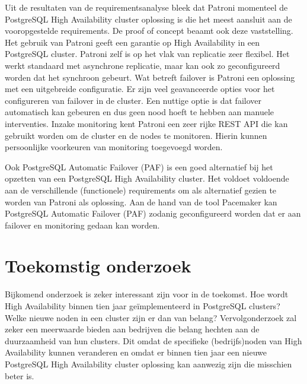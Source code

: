 \documentclass[a0,portrait]{a0poster}
\begin{document}
\begin{multicols}{2}
Uit de resultaten van de requirementsanalyse bleek dat Patroni momenteel de PostgreSQL High Availability cluster oplossing is die het meest aansluit aan de vooropgestelde requirements. De proof of concept beaamt ook deze vaststelling. Het gebruik van Patroni geeft een garantie op High Availability in een PostgreSQL cluster. Patroni zelf is op het vlak van replicatie zeer flexibel. Het werkt standaard met asynchrone replicatie, maar kan ook zo geconfigureerd worden dat het synchroon gebeurt. Wat betreft failover is Patroni een oplossing met een uitgebreide configuratie. Er zijn veel geavanceerde opties voor het configureren van failover in de cluster. Een nuttige optie is dat failover automatisch kan gebeuren en dus geen nood hoeft te hebben aan manuele interventies. Inzake monitoring kent Patroni een zeer rijke REST API die kan gebruikt worden om de cluster en de nodes te monitoren. Hierin kunnen persoonlijke voorkeuren van monitoring toegevoegd worden.

Ook PostgreSQL Automatic Failover (PAF) is een goed alternatief bij het opzetten van een PostgreSQL High Availability cluster. Het voldoet voldoende aan de verschillende (functionele) requirements om als alternatief gezien te worden van Patroni als oplossing. Aan de hand van de tool Pacemaker kan PostgreSQL Automatic Failover (PAF) zodanig geconfigureerd worden dat er aan failover en monitoring gedaan kan worden.


\color{HoGentAccent1} 
\section*{Toekomstig onderzoek}
\color{black}
Bijkomend onderzoek is zeker interessant zijn voor in de toekomst. Hoe wordt High Availability binnen tien jaar geïmplementeerd in PostgreSQL clusters? Welke nieuwe noden in een cluster zijn er dan van belang? Vervolgonderzoek zal zeker een meerwaarde bieden aan bedrijven die belang hechten aan de duurzaamheid van hun clusters.
Dit omdat de specifieke (bedrijfs)noden van High Availability kunnen veranderen en omdat er binnen tien jaar een nieuwe PostgreSQL High Availability cluster oplossing kan aanwezig zijn die misschien beter is.



\end{multicols}
\end{document}
